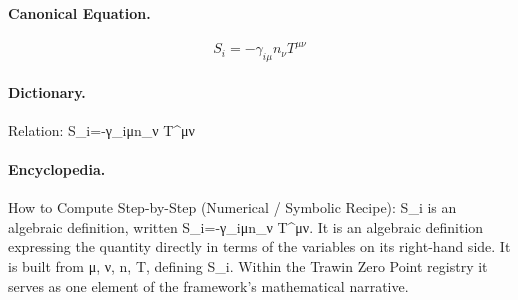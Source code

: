 \paragraph{Canonical Equation.}
\[
S_i=-\gamma_{i\mu}n_\nu T^{\mu\nu}
\]

\paragraph{Dictionary.}
Relation: S\_i=-γ\_iμn\_ν T\textasciicircum{}μν

\paragraph{Encyclopedia.}
How to Compute Step-by-Step (Numerical / Symbolic Recipe): S\_i is an algebraic definition, written S\_i=-γ\_iμn\_ν T\textasciicircum{}μν. It is an algebraic definition expressing the quantity directly in terms of the variables on its right-hand side. It is built from μ, ν, n, T, defining S\_i. Within the Trawin Zero Point registry it serves as one element of the framework's mathematical narrative.
